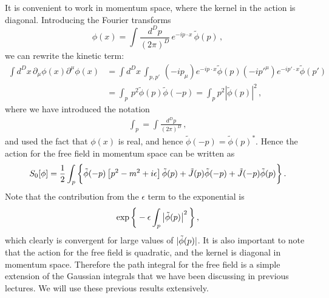 \documentclass[notes]{subfiles}
\begin{document}
  It is convenient to work in momentum space, where the kernel
  in the action is diagonal. Introducing the Fourier transforms
  \begin{equation}
    \label{eq:ScalFieldFourier}
    \phi(x) = \int \frac{d^Dp}{(2\pi)^D}\, e^{-i p\cdot x}\,
    \tilde{\phi}(p)\, ,
  \end{equation}
  we can rewrite the kinetic term: 
  \begin{align}
    \int d^Dx\, \partial_\mu \phi(x) \partial^\mu \phi(x) 
    &= \int d^Dx\, \int_{p,p'}\, (-ip_\mu) e^{-ip \cdot x} \tilde{\phi}(p) 
    (-ip'^\mu) e^{-ip'\cdot x} \tilde{\phi}(p') \\
    &= \int_p \, p^2 \tilde{\phi}(p) \tilde{\phi}(-p)
      =  \int_p p^2 \left|\tilde{\phi}(p)\right|^2\, ,
  \end{align}
  where we have introduced the notation
  \begin{align}
    \int_p  = \int \frac{d^Dp}{(2\pi)^D}\, ,
  \end{align}
  and used the fact that $\phi(x)$ is real, and hence $\tilde{\phi}(-p) =
  \tilde{\phi}(p)^*$. Hence the action for the free field in momentum
  space can be written as
  \begin{align}
    \label{eq:ScalFreeMomSpace}
    S_0[\phi] = \frac12 \int_p \bigg\{
    \tilde{\phi}(-p) \left[p^2 - m^2 + i \epsilon\right] \tilde{\phi}(p) +
    \tilde{J}(p) \tilde{\phi}(-p) + \tilde{J}(-p) \tilde{\phi}(p)
    \bigg\}\, .
  \end{align}
  Note that the contribution from the $\epsilon$ term to the exponential
  is 
  \begin{align}
    \exp\bigg\{
    -\epsilon \int_p \left|\tilde{\phi}(p)\right|^2
    \bigg\}\, ,
  \end{align}
  which clearly is convergent for large values of $|\tilde{\phi}(p)|$.
  It is also important to note that the action for the free field is
  quadratic, and the kernel is diagonal in momentum space. Therefore the
  path integral for the free field is a simple extension of the Gaussian
  integrals that we have been discussing in previous lectures. We will
  use these previous results extensively. 
\end{document}
